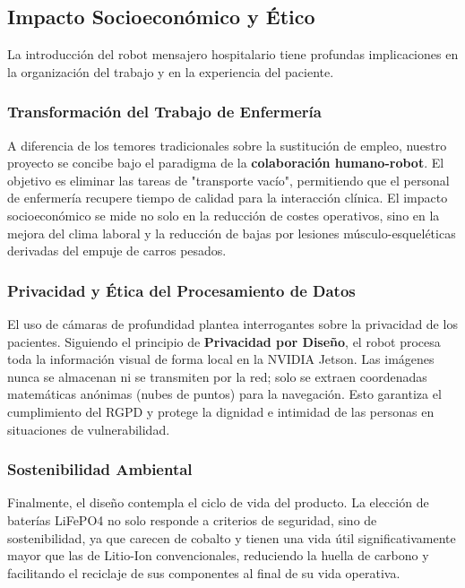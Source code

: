 \subsection{Impacto Socioeconómico y Ético}
La introducción del robot mensajero hospitalario tiene profundas implicaciones en la organización del trabajo y en la experiencia del paciente.

\subsubsection{Transformación del Trabajo de Enfermería}
A diferencia de los temores tradicionales sobre la sustitución de empleo, nuestro proyecto se concibe bajo el paradigma de la \textbf{colaboración humano-robot}. El objetivo es eliminar las tareas de "transporte vacío", permitiendo que el personal de enfermería recupere tiempo de calidad para la interacción clínica. El impacto socioeconómico se mide no solo en la reducción de costes operativos, sino en la mejora del clima laboral y la reducción de bajas por lesiones músculo-esqueléticas derivadas del empuje de carros pesados.

\subsubsection{Privacidad y Ética del Procesamiento de Datos}
El uso de cámaras de profundidad plantea interrogantes sobre la privacidad de los pacientes. Siguiendo el principio de \textbf{Privacidad por Diseño}, el robot procesa toda la información visual de forma local en la NVIDIA Jetson. Las imágenes nunca se almacenan ni se transmiten por la red; solo se extraen coordenadas matemáticas anónimas (nubes de puntos) para la navegación. Esto garantiza el cumplimiento del RGPD y protege la dignidad e intimidad de las personas en situaciones de vulnerabilidad.

\subsubsection{Sostenibilidad Ambiental}
Finalmente, el diseño contempla el ciclo de vida del producto. La elección de baterías LiFePO4 no solo responde a criterios de seguridad, sino de sostenibilidad, ya que carecen de cobalto y tienen una vida útil significativamente mayor que las de Litio-Ion convencionales, reduciendo la huella de carbono y facilitando el reciclaje de sus componentes al final de su vida operativa.
